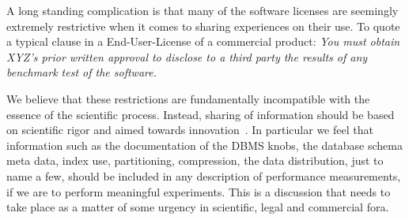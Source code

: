 \documentclass{cidr-2019}
\begin{document}



A long standing complication is that many of the software licenses are
seemingly extremely restrictive when it comes to sharing experiences
on their use. To quote a typical clause in a End-User-License of a
commercial product: \emph{ You must obtain XYZ's
prior written approval
  to disclose to a third party the results of any benchmark test of
  the software.}

%
%

  We believe that these restrictions are fundamentally incompatible
  with the essence of the scientific process. Instead, sharing of
  information should be based on scientific rigor and aimed towards
  innovation~\cite{DBLP:conf/sigmod/RaasveldtHGM18}. In particular we
  feel that information such as the documentation of the DBMS knobs,
  the database schema meta data, index use, partitioning, compression,
  the data distribution, just to name a few, should be included in any
  description of performance measurements, if we are to perform
  meaningful experiments. This is a discussion that needs to take
  place as a matter of some urgency in scientific, legal and
  commercial fora. 
\end{document}
